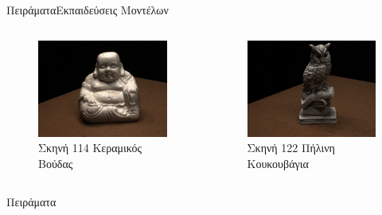 \documentclass[10pt]{beamer}
\begin{document}
\begin{frame}{Πειράματα}{Εκπαιδεύσεις Μοντέλων}
\begin{columns}
        \begin{figure}
            \centering
            \includegraphics[height=.2\textheight]{images/Buda_GT.png}
            \caption{Σκηνή 114 Κεραμικός Βούδας}
        \end{figure}
        \begin{figure}
            \centering
            \includegraphics[height=.2\textheight]{images/Owl_GT.png}
            \caption{Σκηνή 122 Πήλινη Κουκουβάγια}
            \label{fig:enter-label}
        \end{figure}
    \end{columns}
Πειράματα
\begin{table}[H]

\end{table}
\end{frame}
\end{document}
